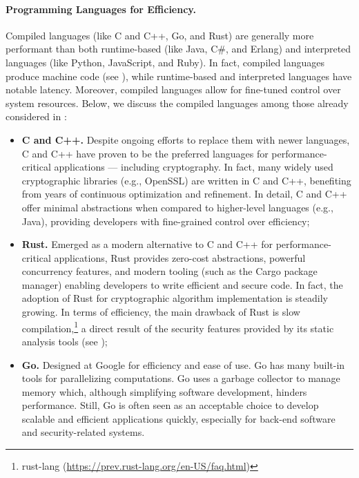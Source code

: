 \paragraph*{Programming Languages for Efficiency.}

Compiled languages (like C and C++, Go, and Rust) are generally more performant than both runtime-based (like Java, C\#, and Erlang) and interpreted languages (like Python, JavaScript, and Ruby). In fact, compiled languages produce machine code (see ), while runtime-based and interpreted languages have notable latency. Moreover, compiled languages allow for fine-tuned control over system resources. Below, we discuss the compiled languages among those already considered in :

\begin{itemize}
	
	\item \textbf{C and C++.} Despite ongoing efforts to replace them with newer languages, C and C++ have proven to be the preferred languages for performance-critical applications --- including cryptography. In fact, many widely used cryptographic libraries (e.g., OpenSSL) are written in C and C++, benefiting from years of continuous optimization and refinement. In detail, C and C++ offer minimal abstractions when compared to higher-level languages (e.g., Java), providing developers with fine-grained control over efficiency;
	
	\item \textbf{Rust.} Emerged as a modern alternative to C and C++ for performance-critical applications, Rust provides zero-cost abstractions, powerful concurrency features, and modern tooling (such as the Cargo package manager) enabling developers to write efficient and secure code. In fact, the adoption of Rust for cryptographic algorithm implementation is steadily growing. In terms of efficiency, the main drawback of Rust is slow compilation,\footnote{rust-lang (\url{https://prev.rust-lang.org/en-US/faq.html})} a direct result of the security features provided by its static analysis tools (see );
	
	\item \textbf{Go.} Designed at Google for efficiency and ease of use. Go has many built-in tools for parallelizing computations. Go uses a garbage collector to manage memory which, although simplifying software development, hinders performance. Still, Go is often seen as an acceptable choice to develop scalable and efficient applications quickly, especially for back-end software and security-related systems.
	
\end{itemize}

